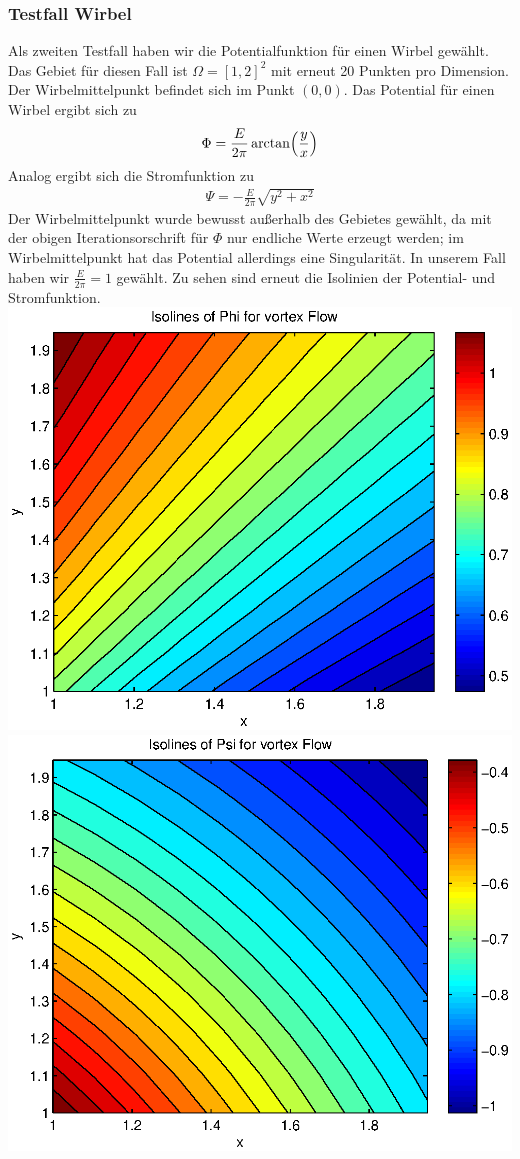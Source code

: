 \documentclass{article}
\begin{document}
\subsubsection{Testfall Wirbel}
Als zweiten Testfall haben wir die Potentialfunktion für einen Wirbel gewählt.
Das Gebiet für diesen Fall ist $\Omega =[1,2]^2$ mit erneut 20 Punkten pro Dimension. 
Der Wirbelmittelpunkt befindet sich im Punkt
$(0,0)$. Das Potential für einen Wirbel ergibt sich zu
\begin{align}
\Phi = \frac{E}{2\pi}\arctan\Bigl(\frac{y}{x}\Bigr)
\end{align}
Analog ergibt sich die Stromfunktion zu
\begin{align}
\Psi = -\frac{E}{2\pi}\sqrt{{y}^2+{x}^2}
\end{align}
Der Wirbelmittelpunkt wurde bewusst außerhalb des Gebietes gewählt, da 
mit der obigen Iterationsorschrift für $\Phi$ nur endliche Werte erzeugt werden;
im Wirbelmittelpunkt hat das Potential allerdings eine Singularität. In unserem Fall
haben wir $\frac{E}{2\pi}=1$ gewählt.
Zu sehen sind erneut die Isolinien der Potential- und Stromfunktion.\\
\includegraphics[scale=0.4]{test/2vortex/phi.eps}
\includegraphics[scale=0.4]{test/2vortex/psi.eps}\newpage
\end{document}
